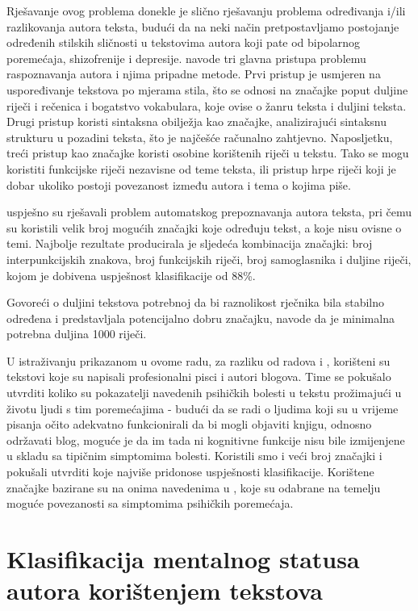 \documentclass[10pt, a4paper]{article}
\begin{document}
Rješavanje ovog problema donekle je slično rješavanju problema određivanja i/ili razlikovanja autora teksta, budući da na neki način pretpostavljamo postojanje određenih stilskih sličnosti u tekstovima autora koji pate od bipolarnog poremećaja, shizofrenije i depresije. \citet{coyotl} navode tri glavna pristupa problemu raspoznavanja autora i njima pripadne metode. Prvi pristup je usmjeren na uspoređivanje tekstova po mjerama stila, što se odnosi na značajke poput duljine riječi i rečenica i bogatstvo vokabulara, koje ovise o žanru teksta i duljini teksta. Drugi pristup koristi sintaksna obilježja kao značajke, analizirajući sintaksnu strukturu u pozadini teksta, što je najčešće računalno zahtjevno. Naposljetku, treći pristup kao značajke koristi osobine korištenih riječi u tekstu. Tako se mogu koristiti funkcijske riječi nezavisne od teme teksta, ili pristup hrpe riječi koji je dobar ukoliko postoji povezanost između autora i tema o kojima piše.

\citet{kristo} uspješno su rješavali problem automatskog prepoznavanja autora teksta, pri čemu su koristili velik broj mogućih značajki koje određuju tekst, a koje nisu ovisne o temi. Najbolje rezultate producirala je sljedeća kombinacija značajki: broj interpunkcijskih znakova, broj funkcijskih riječi, broj samoglasnika i duljine riječi, kojom je dobivena uspješnost klasifikacije od 88\%.

Govoreći o duljini tekstova potrebnoj da bi raznolikost rječnika bila stabilno određena i predstavljala potencijalno dobru značajku, \citet{tweedie} navode da je minimalna potrebna duljina 1000 riječi.

U istraživanju prikazanom u ovome radu, za razliku od radova \citep{strous-2009} i \citep{exray}, korišteni su tekstovi koje su napisali profesionalni pisci i autori blogova. Time se pokušalo utvrditi koliko su pokazatelji navedenih psihičkih bolesti u tekstu prožimajući u životu ljudi s tim poremećajima - budući da se radi o ljudima koji su u vrijeme pisanja očito adekvatno funkcionirali da bi mogli objaviti knjigu, odnosno održavati blog, moguće je da im tada ni kognitivne funkcije nisu bile izmijenjene u skladu sa tipičnim simptomima bolesti. Koristili smo i veći broj značajki i pokušali utvrditi koje najviše pridonose uspješnosti klasifikacije. Korištene značajke bazirane su na onima navedenima u \citep{kristo}, koje su odabrane na temelju moguće povezanosti sa simptomima psihičkih poremećaja.


\section{Klasifikacija mentalnog statusa autora korištenjem tekstova}
\end{document}
